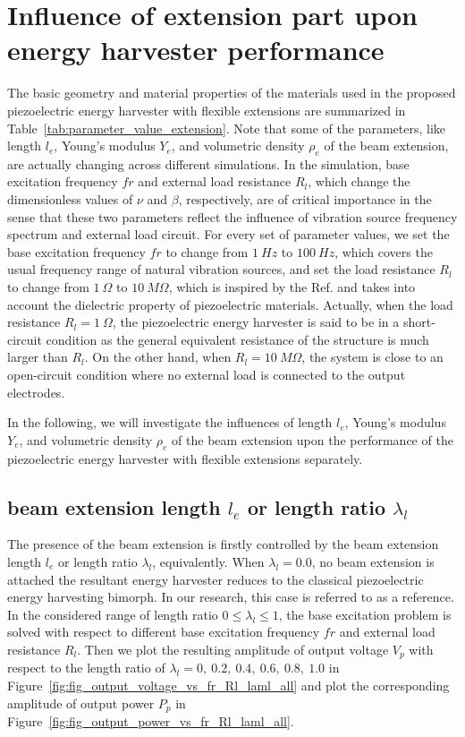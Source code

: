 \documentclass{elsarticle}
\begin{document}
\section{Influence of extension part upon energy harvester performance}


The basic geometry and material properties of the materials used in the proposed piezoelectric energy harvester with flexible extensions are summarized in Table~\ref{tab:parameter_value_extension}. Note that some of the parameters, like length $l_e$, Young's modulus $Y_e$, and volumetric density $\rho_e$ of the beam extension, are actually changing across different simulations. In the simulation, base excitation frequency $fr$ and external load resistance $R_l$, which change the dimensionless values of $\nu$ and $\beta$, respectively, are of critical importance in the sense that these two parameters reflect the influence of vibration source frequency spectrum and external load circuit. For every set of parameter values, we set the base excitation frequency $fr$ to change from $1\ Hz$ to $100\ Hz$, which covers the usual frequency range of natural vibration sources, and set the load resistance $R_l$ to change from $1\ \Omega$ to $10\ M\Omega$, which is inspired by the Ref. \cite{erturk2009experimentally} and takes into account the dielectric property of piezoelectric materials. Actually, when the load resistance $R_l = 1\ \Omega$, the piezoelectric energy harvester is said to be in a short-circuit condition as the general equivalent resistance of the structure is much larger than $R_l$. On the other hand, when $R_l = 10\ M\Omega$, the system is close to an open-circuit condition where no external load is connected to the output electrodes.

In the following, we will investigate the influences of length $l_e$, Young's modulus $Y_e$, and volumetric density $\rho_e$ of the beam extension upon the performance of the piezoelectric energy harvester with flexible extensions separately.

\subsection{beam extension length $l_e$ or length ratio $\lambda_l$}

The presence of the beam extension is firstly controlled by the beam extension length $l_e$ or length ratio $\lambda_l$, equivalently. When $\lambda_l = 0.0$, no beam extension is attached the resultant energy harvester reduces to the classical piezoelectric energy harvesting bimorph. \cite{erturk2009experimentally} In our research, this case is referred to as a reference. In the considered range of length ratio $0 \leq \lambda_l \leq 1$, the base excitation problem is solved with respect to different base excitation frequency $fr$ and external load resistance $R_l$. Then we plot the resulting amplitude of output voltage $V_p$ with respect to the length ratio of $\lambda_l = 0,\ 0.2,\ 0.4,\ 0.6,\ 0.8,\ 1.0$ in Figure~\ref{fig:fig_output_voltage_vs_fr_Rl_laml_all} and plot the corresponding amplitude of output power $P_p$ in Figure~\ref{fig:fig_output_power_vs_fr_Rl_laml_all}.
\end{document}
